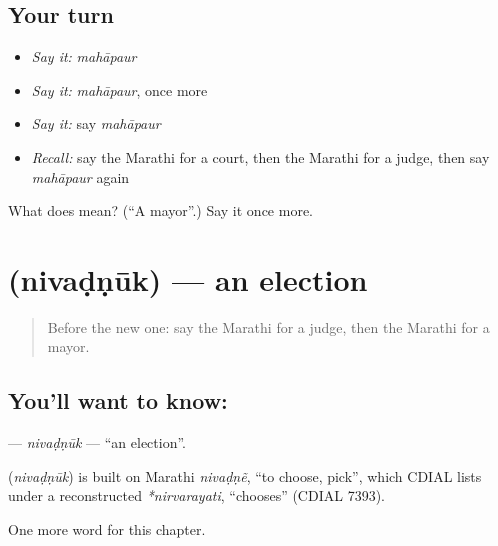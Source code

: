 \subsection*{Your turn}
\begin{itemize}
\raggedright
  \item \emph{Say it:} \emph{mahāpaur}
  \item \emph{Say it:} \emph{mahāpaur}, once more
  \item \emph{Say it:} say \emph{mahāpaur}
  \item \emph{Recall:} say the Marathi for a court, then the Marathi for a judge, then say \emph{mahāpaur} again
\end{itemize}

\begin{tcolorbox}[breakable,colback=teal!4,colframe=teal!35!black,title={Before you move on}]
What does  mean? (\textquotedblleft{}A mayor\textquotedblright{}.) Say it once more.
\end{tcolorbox}
\section[\texorpdfstring{\mr{निवडणूक} (nivaḍṇūk)}{निवडणूक (nivaḍṇūk)}]{ (nivaḍṇūk) — an election}

\label{lesson:MR-C179-nivadnuk}



\begin{quote}
Before the new one: say the Marathi for a judge, then the Marathi for a mayor.
\end{quote}

\subsection*{You'll want to know: }
\textbf{} — \emph{nivaḍṇūk} — \textquotedblleft{}an election\textquotedblright{}.

\begin{cousinweb}
\textbf{} (\emph{nivaḍṇūk}) is built on Marathi \emph{nivaḍṇẽ}, \textquotedblleft{}to choose, pick\textquotedblright{}, which CDIAL lists under a reconstructed \emph{*nirvarayati}, \textquotedblleft{}chooses\textquotedblright{} (CDIAL 7393).
\end{cousinweb}

\begin{grammarlens}[title={What you've built}]
One more word for this chapter.
\end{grammarlens}

